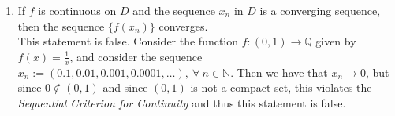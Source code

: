 \documentclass[12pt,letterpaper]{article}
\newcommand{\N}{\mathbb{N}}
\newcommand{\Q}{\mathbb{Q}}
\theoremstyle{case}
\theoremstyle{definition}
\begin{document}
\begin{enumerate}
\begin{enumerate}
			\item If $f$ is continuous on $D$ and the sequence $x_n$ in $D$ is a converging sequence, then the sequence $\{f(x_n)\}$ converges.\\
			
			This statement is false. Consider the function $f:(0,1) \to \Q$ given by $f(x)=\frac{1}{x}$, and consider the sequence $x_n:= (0.1, 0.01,0.001,0.0001, \dots),\ \forall\ n \in \N$. Then we have that $x_n \to 0$, but since $0 \notin (0,1)$ and since $(0,1)$ is not a compact set, this violates the \textit{Sequential Criterion for Continuity} and thus this statement is false.
		\end{enumerate}	
	\end{enumerate}
\end{document}
